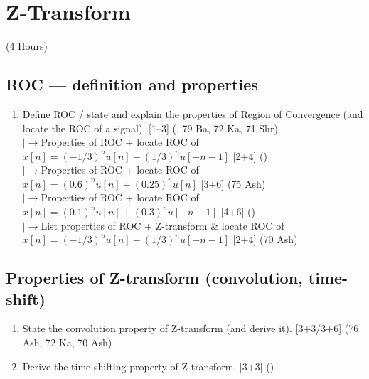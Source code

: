 \documentclass[12pt]{article}
\newcommand{\lb}{\\$\left|\rightarrow\right.$}
\begin{document}
\pagebreak
\section{Z-Transform}
\begin{center}(4 Hours)\end{center}

  \subsection{ROC --- definition and properties}
    \begin{enumerate}[topsep=0pt, noitemsep]
      \item Define ROC / state and explain the properties of Region of Convergence (and locate the ROC of a signal). \hfill [1--3] (, 79 Ba, 72 Ka, 71 Shr)
        \lb Properties of ROC + locate ROC of $x[n]=(-1/3)^n u[n]-(1/3)^n u[-n-1]$ \hfill [2+4] ()
        \lb Properties of ROC + locate ROC of $x[n]=(0.6)^n u[n]+(0.25)^n u[n]$ \hfill [3+6] (75 Ash)
        \lb Properties of ROC + locate ROC of $x[n]=(0.1)^n u[n]+(0.3)^n u[-n-1]$ \hfill [4+6] ()
        \lb List properties of ROC + Z-transform \& locate ROC of $x[n]=(-1/3)^n u[n]-(1/3)^n u[-n-1]$ \hfill [2+4] (70 Ash)
    \end{enumerate}

  \subsection{Properties of Z-transform (convolution, time-shift)}
    \begin{enumerate}[topsep=0pt, noitemsep]
      \item State the convolution property of Z-transform (and derive it). \hfill [3+3/3+6] (76 Ash, 72 Ka, 70 Ash)
      \item Derive the time shifting property of Z-transform. \hfill [3+3] ()
    \end{enumerate}
\end{document}
